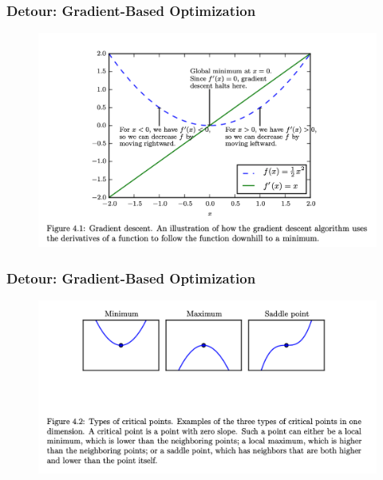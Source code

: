 \documentclass[
  shownotes,
  xcolor={svgnames},
  hyperref={colorlinks,citecolor=DarkBlue,linkcolor=DarkRed,urlcolor=DarkBlue}
  , aspectratio=169]{beamer}
\begin{document}
\begin{frame}[fragile]
\frametitle{Detour: Gradient-Based Optimization}



\begin{figure}[H] \centering
            \captionsetup{justification=centering}
              \includegraphics[scale=0.4]{figures/gradient_descent}
 \end{figure}
 \end{frame}
\begin{frame}[fragile]
\frametitle{Detour: Gradient-Based Optimization}



\begin{figure}[H] \centering
            \captionsetup{justification=centering}
              \includegraphics[scale=0.4]{figures/gradient_descent_2}
 \end{figure}
 
 \end{frame}
\end{document}

